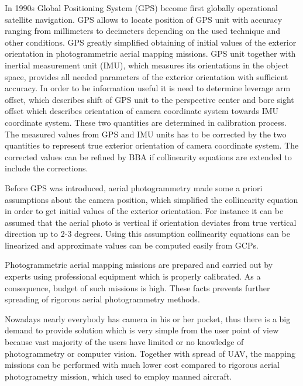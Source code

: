 \documentclass[a4paper,12pt]{article}
\begin{document}
In 1990s Global Positioning System (GPS) become first globally operational satellite navigation.
GPS allows 
to locate position of GPS unit with accuracy ranging  from  millimeters to decimeters depending 
on the used technique and other conditions. 
GPS greatly simplified obtaining of initial values of the exterior orientation in photogrammetric aerial mapping missions.
GPS unit together with 
inertial measurement unit (IMU), which measures its orientations in the object space,
provides all needed parameters of the exterior orientation with sufficient accuracy. In order to be information useful it is need to determine 
leverage arm offset, which describes shift of GPS unit to the perspective center and bore sight offset
which describes orientation of camera coordinate system towards IMU coordinate system. These two
quantities are determined in calibration process. The measured values from GPS and IMU units has to
be corrected by the two quantities to represent true exterior orientation of camera coordinate system. The corrected values 
can be refined by BBA if collinearity equations are extended to include the corrections.

Before GPS was introduced, aerial photogrammetry made some a priori assumptions about the camera position,
which simplified the collinearity equation in order to get initial values of the exterior orientation. 
For instance it can be assumed that the aerial photo is vertical if orientation deviates from true vertical
direction up to 2-3 degrees. Using this assumption collinearity equations can be linearized and 
approximate values can be computed easily from GCPs.


Photogrammetric aerial mapping missions are prepared and carried out by experts using 
professional equipment which is properly calibrated.
As a consequence, budget of such missions
is high. These facts prevents further spreading of rigorous aerial photogrammetry methods.

Nowadays nearly everybody has camera in his or her pocket, thus there is a big demand 
to provide solution which is very simple from the user point of view because 
vast majority of the users have limited or no knowledge of photogrammetry or computer vision. 
Together with spread of UAV, the mapping missions can be performed with much lower 
cost compared to rigorous aerial photogrametry mission, which used to employ manned aircraft.

\end{document}
